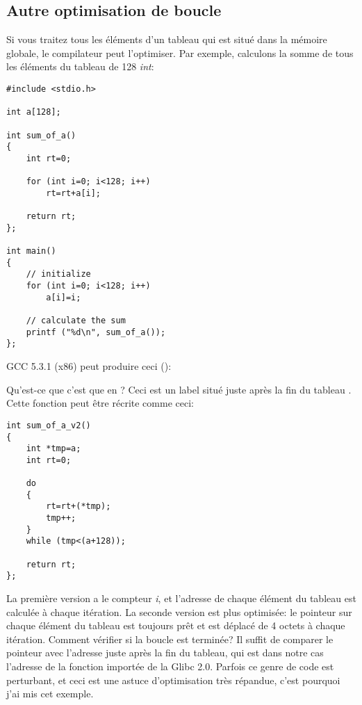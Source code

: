 \subsection{Autre optimisation de boucle}

Si vous traitez tous les éléments d'un tableau qui est situé dans la mémoire globale,
le compilateur peut l'optimiser.
Par exemple, calculons la somme de tous les éléments du tableau de 128 \emph{int}:

\begin{lstlisting}[style=customc]
#include <stdio.h>

int a[128];

int sum_of_a()
{
	int rt=0;
	
	for (int i=0; i<128; i++)
		rt=rt+a[i];

	return rt;
};

int main()
{
	// initialize
	for (int i=0; i<128; i++)
		a[i]=i;
	
	// calculate the sum
	printf ("%d\n", sum_of_a());
};
\end{lstlisting}

GCC 5.3.1 (x86) \Optimizing peut produire ceci (\IDA):



Qu'est-ce que c'est que  en ?
Ceci est un label situé juste après la fin du tableau .
Cette fonction peut être récrite comme ceci:

\begin{lstlisting}[style=customc]
int sum_of_a_v2()
{
	int *tmp=a;
	int rt=0;
	
	do
	{
		rt=rt+(*tmp);
		tmp++;
	}
	while (tmp<(a+128));

	return rt;
};
\end{lstlisting}

La première version a le compteur \emph{i}, et l'adresse de chaque élément du tableau
est calculée à chaque itération.
La seconde version est plus optimisée: le pointeur sur chaque élément du tableau
est toujours prêt et est déplacé de 4 octets à chaque itération.
Comment vérifier si la boucle est terminée?
Il suffit de comparer le pointeur avec l'adresse juste après la fin du tableau, qui
est dans notre cas l'adresse de la fonction  importée de la Glibc 2.0.
Parfois ce genre de code est perturbant, et ceci est une astuce d'optimisation très
répandue, c'est pourquoi j'ai mis cet exemple.

